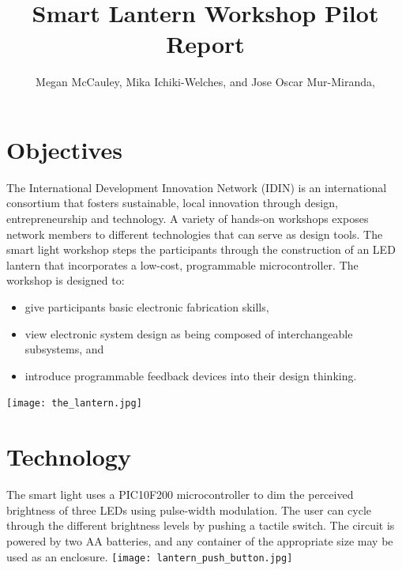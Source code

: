 \documentclass[11pt, twocolumn]{article}
\title{Smart Lantern Workshop Pilot Report\\\vspace{.1in}{July 26-28, 2014, Orkolili, Tanzania}} %
\author{Megan McCauley, Mika Ichiki-Welches, and Jose Oscar Mur-Miranda,\\} %
\date{} %
\begin{document}
\maketitle %

\thispagestyle{fancy} %




\section*{Objectives}
The International Development Innovation Network (IDIN) is an international consortium that fosters sustainable, local innovation through design, entrepreneurship and technology. A variety of hands-on workshops exposes network members to different technologies that can serve as design tools. The smart light workshop steps the participants through the construction of an LED lantern that incorporates a low-cost, programmable microcontroller.
The workshop is designed to:
\begin{itemize}
\item give participants basic electronic fabrication skills,
\item view electronic system design as being composed of interchangeable subsystems, and
\item introduce programmable feedback devices into their design thinking.
\end{itemize}
\texttt{[image: the\_lantern.jpg]}

\section*{Technology}
The smart light uses a PIC10F200 microcontroller to dim the perceived brightness of three LEDs using pulse-width modulation. The user can cycle through the different brightness levels by pushing a tactile switch. The circuit is powered by two AA batteries, and any container of the appropriate size may be used as an enclosure.
\texttt{[image: lantern\_push\_button.jpg]}
\end{document}
